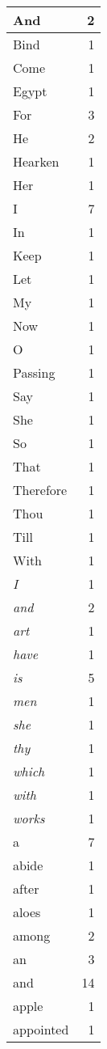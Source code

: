 \begin{center}
\begin{longtable}{l|r}
And & 2\\ \hline 
Bind & 1\\ \hline 
Come & 1\\ \hline 
Egypt & 1\\ \hline 
For & 3\\ \hline 
He & 2\\ \hline 
Hearken & 1\\ \hline 
Her & 1\\ \hline 
I & 7\\ \hline 
In & 1\\ \hline 
Keep & 1\\ \hline 
Let & 1\\ \hline 
My & 1\\ \hline 
Now & 1\\ \hline 
O & 1\\ \hline 
Passing & 1\\ \hline 
Say & 1\\ \hline 
She & 1\\ \hline 
So & 1\\ \hline 
That & 1\\ \hline 
Therefore & 1\\ \hline 
Thou & 1\\ \hline 
Till & 1\\ \hline 
With & 1\\ \hline 
\emph{I} & 1\\ \hline 
\emph{and} & 2\\ \hline 
\emph{art} & 1\\ \hline 
\emph{have} & 1\\ \hline 
\emph{is} & 5\\ \hline 
\emph{men} & 1\\ \hline 
\emph{she} & 1\\ \hline 
\emph{thy} & 1\\ \hline 
\emph{which} & 1\\ \hline 
\emph{with} & 1\\ \hline 
\emph{works} & 1\\ \hline 
a & 7\\ \hline 
abide & 1\\ \hline 
after & 1\\ \hline 
aloes & 1\\ \hline 
among & 2\\ \hline 
an & 3\\ \hline 
and & 14\\ \hline 
apple & 1\\ \hline 
appointed & 1\\ \hline 

\end{longtable}
\end{center}
